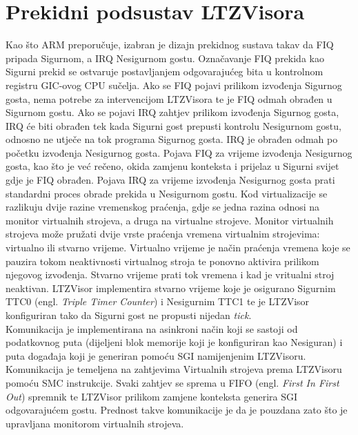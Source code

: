 \documentclass[times, utf8, diplomski, numeric]{fer}
\begin{document}
\section{Prekidni podsustav LTZVisora}
Kao što ARM preporučuje, izabran je dizajn prekidnog sustava takav da FIQ pripada Sigurnom, a IRQ Nesigurnom gostu. Označavanje
FIQ prekida kao Sigurni prekid se ostvaruje postavljanjem odgovarajućeg bita u kontrolnom registru GIC-ovog CPU sučelja.
Ako se FIQ pojavi prilikom izvođenja Sigurnog gosta, nema potrebe za intervencijom LTZVisora te je FIQ odmah obrađen u
Sigurnom gostu. Ako se pojavi IRQ zahtjev prilikom izvođenja Sigurnog gosta, IRQ će biti obrađen tek kada Sigurni gost prepusti
kontrolu Nesigurnom gostu, odnosno ne utječe na tok programa Sigurnog gosta. IRQ je obrađen odmah po početku izvođenja
Nesigurnog gosta. Pojava FIQ za vrijeme izvođenja Nesigurnog gosta, kao što je već rečeno, okida zamjenu konteksta i prijelaz
u Sigurni svijet gdje je FIQ obrađen. Pojava IRQ za vrijeme izvođenja Nesigurnog gosta prati standardni proces obrade prekida
u Nesigurnom gostu. Kod virtualizacije se razlikuju dvije razine vremenskog praćenja, gdje se jedna razina odnosi na monitor
virtualnih strojeva, a druga na virtualne strojeve. Monitor virtualnih strojeva može pružati dvije vrste praćenja vremena
virtualnim strojevima: virtualno ili stvarno vrijeme. Virtualno vrijeme je način praćenja vremena koje se pauzira tokom
neaktivnosti virtualnog stroja te ponovno aktivira prilikom njegovog izvođenja. Stvarno vrijeme prati tok vremena i kad je
vritualni stroj neaktivan. LTZVisor implementira stvarno vrijeme koje je osigurano Sigurnim TTC0 (engl. \textit{Triple Timer
Counter}) i Nesigurnim TTC1 te je LTZVisor konfiguriran tako da Sigurni gost ne propusti nijedan \textit{tick}.\\
Komunikacija je implementirana na asinkroni način koji se sastoji od podatkovnog puta (dijeljeni blok memorije koji je
konfiguriran kao Nesiguran) i puta događaja koji je generiran pomoću SGI namijenjenim LTZVisoru. Komunikacija je temeljena
na zahtjevima Virtualnih strojeva prema LTZVisoru pomoću SMC instrukcije. Svaki zahtjev se sprema u FIFO (engl. \textit{First
In First Out}) spremnik te LTZVisor prilikom zamjene konteksta generira SGI odgovarajućem gostu. Prednost takve komunikacije
je da je pouzdana zato što je upravljana monitorom virtualnih strojeva.
\end{document}
